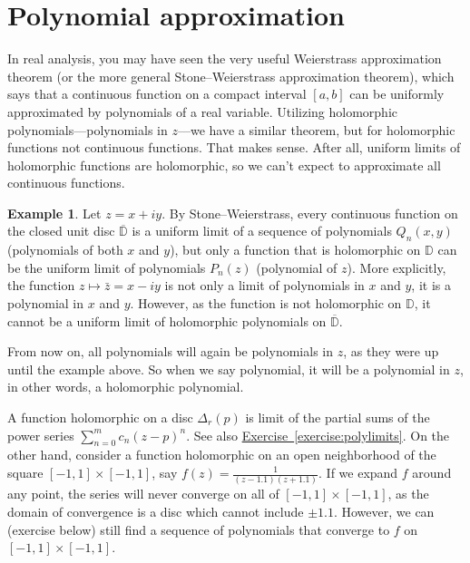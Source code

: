 \documentclass[12pt,openany]{book}
\newcommand{\D}{{\mathbb{D}}}
\theoremstyle{plain}
\theoremstyle{remark}
\theoremstyle{definition}
\theoremstyle{exercise}
\theoremstyle{example}
\newtheorem{example}[thm]{Example}
\newcommand{\exerciseref}[1]{\hyperref[#1]{Exercise~\ref*{#1}}}
\begin{document}

\section{Polynomial approximation}
\label{sec:polyapprox}

In real analysis, you may have seen the very useful
Weierstrass approximation theorem (or the more general
Stone--Weierstrass approximation theorem), which says that a continuous function
on a compact interval $[a,b]$ can be uniformly approximated by polynomials
of a real variable.  Utilizing holomorphic polynomials---polynomials in $z$---we have a
similar theorem, but for holomorphic functions not
continuous functions.  That makes sense.  After all, uniform limits of
holomorphic functions are holomorphic, so we can't expect to approximate all
continuous functions.

\begin{example}
Let $z = x+iy$.
By Stone--Weierstrass,
every continuous function on the closed unit disc $\overline{\D}$
is a uniform limit of a sequence of polynomials
$Q_n(x,y)$ (polynomials of both $x$ and $y$), but only a function that is
holomorphic on $\D$ can be the uniform limit of polynomials
$P_n(z)$ (polynomial of $z$).
More explicitly, the function $z \mapsto \bar{z}=x-iy$ is not only a limit of
polynomials in $x$ and $y$, it is a polynomial in $x$ and $y$.  However, as
the function is not holomorphic on $\D$, it cannot be a
uniform limit of holomorphic polynomials on $\overline{\D}$.
\end{example}

From now on, all polynomials will again be polynomials in $z$, as they were
up until the example above.  So when we say polynomial, it will be
a polynomial in $z$, in other words, a holomorphic polynomial.

A function holomorphic on a disc $\Delta_r(p)$ is limit of the partial sums
of the power series $\sum_{n=0}^m c_n {(z-p)}^n$.  See also
\exerciseref{exercise:polylimits}.  On the other hand, consider a function 
holomorphic on an open neighborhood of the square $[-1,1] \times [-1,1]$, say
$f(z) = \frac{1}{(z-1.1)(z+1.1)}$.  If we expand $f$ around any point, the
series will never converge on all of $[-1,1] \times [-1,1]$, as the domain
of convergence is a disc which cannot include $\pm 1.1$.  However, we can
(exercise below) still find a sequence of polynomials that converge to $f$
on $[-1,1] \times [-1,1]$.
\end{document}
